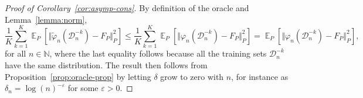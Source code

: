 \documentclass[alpha-refs]{wiley-article}
\DeclareMathOperator{\E}{\mathbb{E}} %
\newcommand{\N}{\mathbb{N}}
\renewcommand{\phi}{\varphi}
\renewcommand{\epsilon}{\varepsilon}
\newcommand{\1}{\mathbb{1}} %
\newcommand{\data}{\ensuremath{\mathcal{D}}}
\providecommand{\DIFaddbegin}{} %
\providecommand{\DIFaddend}{} %
\providecommand{\DIFdelbegin}{} %
\providecommand{\DIFdelend}{} %
\begin{document}
\DIFdelbegin %
\DIFdelend \DIFaddbegin \begin{proof}[Proof of Corollary~\ref{cor:asymp-cons}]
  \DIFaddend By definition of the oracle and Lemma~\ref{lemma:norm},
  \begin{equation*}
    \frac{1}{K} \sum_{k=1}^{K} \E_{P}{\left[ \Vert \tilde{\phi}_n(\data_n^{-k}) - F_P \Vert_{P}^2
      \right]} \leq
    \frac{1}{K} \sum_{k=1}^{K}\E_{P}{\left[ \Vert
        \phi_n(\data_n^{-k}) - F_P \Vert_{P}^2
      \right]}
    =
    \E_{P}{\left[ \Vert \phi_n(\data_n^{-k}) - F_P \Vert_{P}^2
      \right]},
  \end{equation*}
  for all \( n \in \N \), where the last equality follows because all
  the training sets \( \data_n^{-k} \) have the same distribution. The
  result then follows from Proposition~\ref{prop:oracle-prop} by
  letting $\delta$ grow to zero with \( n \), for instance as
  $\delta_n = \log(n)^{-\epsilon}$ for some $\epsilon>0$.
\end{proof}





\end{document}
